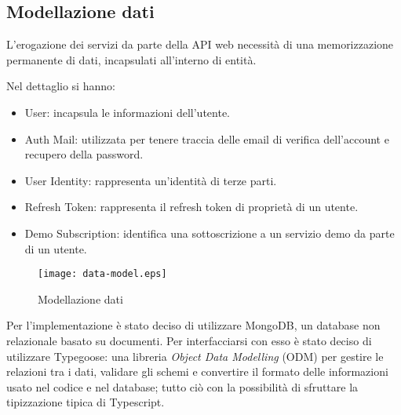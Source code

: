 \subsection{Modellazione dati}
L'erogazione dei servizi da parte della API web necessità di una memorizzazione permanente di dati, incapsulati all'interno di entità.

Nel dettaglio si hanno:
\begin{itemize}
    \itemsep0em
    \item User: incapsula le informazioni dell'utente.
    \item Auth Mail: utilizzata per tenere traccia delle email di verifica dell'account e recupero della password.
    \item User Identity: rappresenta un'identità di terze parti.
    \item Refresh Token: rappresenta il refresh token di proprietà di un utente.
    \item Demo Subscription: identifica una sottoscrizione a un servizio demo da parte di un utente.
\end{itemize}

\begin{figure}[h]
    \centering
    \texttt{[image: data-model.eps]}
    \caption{Modellazione dati}
    \label{fig:DataModel}
\end{figure}

Per l'implementazione è stato deciso di utilizzare MongoDB, un database non relazionale basato su documenti.
Per interfacciarsi con esso è stato deciso di utilizzare Typegoose\cite{Typegoose}: una libreria \textit{Object Data Modelling} (ODM) per gestire le relazioni tra i dati,
validare gli schemi e convertire il formato delle informazioni usato nel codice e nel database; tutto ciò con la possibilità di sfruttare la tipizzazione tipica di Typescript.
